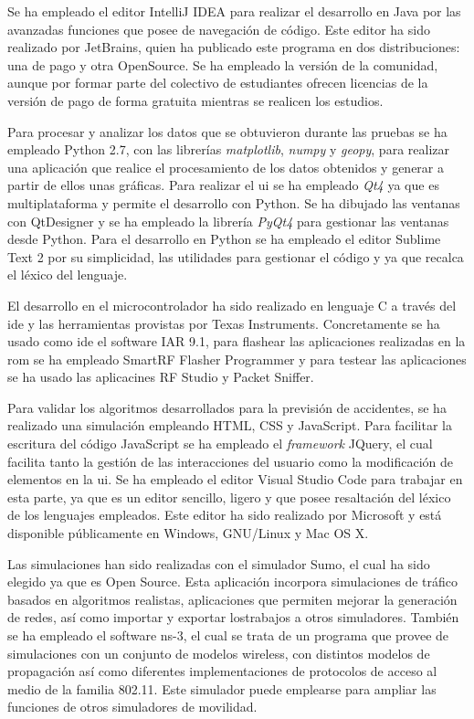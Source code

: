 Se ha empleado el editor IntelliJ IDEA para realizar el desarrollo en Java por
las avanzadas funciones que posee de navegación de código. Este editor ha sido
realizado por JetBrains, quien ha publicado este programa en dos distribuciones:
una de pago y otra OpenSource. Se ha empleado la versión de la comunidad,
aunque por formar parte del colectivo de estudiantes ofrecen licencias de la
versión de pago de forma gratuita mientras se realicen los estudios.

Para procesar y analizar los datos que se obtuvieron durante las pruebas se ha
empleado Python 2.7, con las librerías \emph{matplotlib}, \emph{numpy} y
\emph{geopy}, para realizar una aplicación que realice el procesamiento de
los datos obtenidos y generar a partir de ellos unas gráficas. Para realizar
el \gls{ui} se ha empleado \emph{Qt4} ya que es multiplataforma y permite
el desarrollo con Python. Se ha dibujado las ventanas con QtDesigner y se ha
empleado la librería \emph{PyQt4} para gestionar las ventanas desde Python. Para
el desarrollo en Python se ha empleado el editor Sublime Text 2 por su
simplicidad, las utilidades para gestionar el código y ya que recalca el léxico
del lenguaje.

El desarrollo en el microcontrolador ha sido realizado en lenguaje C a través
del \gls{ide} y las herramientas provistas por Texas Instruments. Concretamente
se ha usado como \gls{ide} el software IAR 9.1, para flashear las aplicaciones
realizadas en la \gls{rom} se ha empleado SmartRF Flasher Programmer y para
testear las aplicaciones se ha usado las aplicacines RF Studio y Packet Sniffer.

Para validar los algoritmos desarrollados para la previsión de accidentes, se
ha realizado una simulación empleando HTML, CSS y JavaScript. Para facilitar
la escritura del código JavaScript se ha empleado el \emph{framework} JQuery,
el cual facilita tanto la gestión de las interacciones del usuario como la
modificación de elementos en la \gls{ui}. Se ha empleado el editor Visual
Studio Code para trabajar en esta parte, ya que es un editor sencillo, ligero
y que posee resaltación del léxico de los lenguajes empleados. Este editor ha
sido realizado por Microsoft y está disponible públicamente en Windows,
GNU/Linux y Mac OS X.

Las simulaciones han sido realizadas con el simulador Sumo, el cual ha sido
elegido ya que es Open Source. Esta aplicación incorpora simulaciones de
tráfico basados en algoritmos realistas, aplicaciones que permiten mejorar la
generación de redes, así como importar y exportar lostrabajos a otros
simuladores. También se ha empleado el software ns-3, el cual se trata de un
programa que provee de simulaciones con un conjunto de modelos wireless, con
distintos modelos de propagación así como diferentes implementaciones de
protocolos de acceso al medio de la familia 802.11. Este simulador
puede emplearse para ampliar las funciones de otros simuladores de movilidad.

